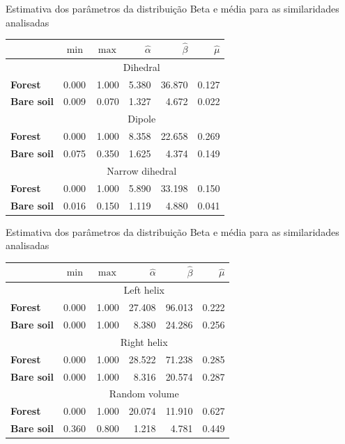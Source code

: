 \documentclass[10pt]{beamer}
\begin{document}
\begin{frame}{Estimativa dos parâmetros da distribuição Beta e média para as similaridades analisadas}
\begin{table}[hbt]
\centering
\begin{tabular}{lrrrrr}
\toprule
& $\min$ & $\max$ & $\widehat\alpha$ & $\widehat\beta$ & $\widehat\mu$\\ \midrule
& \multicolumn{5}{c}{Dihedral}\\
\cmidrule(lr){2-6}
\textbf{Forest} & 0.000 & 1.000 & 5.380 & 36.870 & 0.127\\
\textbf{Bare soil} & 0.009 & 0.070 & 1.327 & 4.672 & 0.022\\
\midrule
%
& \multicolumn{5}{c}{Dipole}\\
\cmidrule(lr){2-6}
\textbf{Forest} & 0.000 & 1.000 & 8.358 & 22.658 & 0.269\\
\textbf{Bare soil} & 0.075 & 0.350 & 1.625 & 4.374 & 0.149\\
\midrule
%
& \multicolumn{5}{c}{Narrow dihedral}\\
\cmidrule(lr){2-6}
\textbf{Forest} & 0.000 & 1.000 & 5.890 & 33.198 & 0.150\\
\textbf{Bare soil} & 0.016 & 0.150 & 1.119 & 4.880 & 0.041\\
\bottomrule
\end{tabular}
\end{table}
\end{frame}

\begin{frame}{Estimativa dos parâmetros da distribuição Beta e média para as similaridades analisadas}
\begin{table}[hbt]
\centering
\begin{tabular}{lrrrrr}
\toprule
& $\min$ & $\max$ & $\widehat\alpha$ & $\widehat\beta$ & $\widehat\mu$\\ \midrule
& \multicolumn{5}{c}{Left helix}\\
\cmidrule(lr){2-6}
\textbf{Forest} & 0.000 & 1.000 & 27.408 & 96.013 & 0.222\\
\textbf{Bare soil} & 0.000 & 1.000 & 8.380 & 24.286 & 0.256\\
\midrule
& \multicolumn{5}{c}{Right helix}\\
\cmidrule(lr){2-6}
\textbf{Forest} & 0.000 & 1.000 & 28.522 & 71.238 & 0.285\\
\textbf{Bare soil} & 0.000 & 1.000 & 8.316 & 20.574 & 0.287\\
\midrule
%
& \multicolumn{5}{c}{Random volume}\\
\cmidrule(lr){2-6}
\textbf{Forest} & 0.000 & 1.000 & 20.074 & 11.910 & 0.627\\
\textbf{Bare soil} & 0.360 & 0.800 & 1.218 & 4.781 & 0.449\\
\bottomrule
\end{tabular}
\end{table}
\end{frame}
\end{document}
